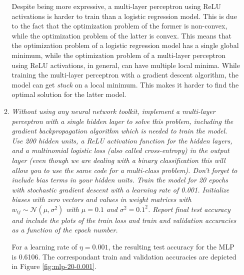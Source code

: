 \documentclass[12pt]{article}
\begin{document}
\begin{enumerate}[leftmargin=\labelsep]
\begin{enumerate}[label=\alph*)]
                    \vspace{12pt}

                    Despite being more expressive, a multi-layer perceptron using ReLU activations is harder to train than a logistic regression model. This is due to the fact that the optimization problem of the former is non-convex, while the optimization problem of the latter is convex. This means that the optimization problem of a logistic regression model has a single global minimum, while the optimization problem of a multi-layer perceptron using ReLU activations, in general, can have multiple local minima. While training the multi-layer perceptron with a gradient descent algorithm, the model can get \textit{stuck} on a local minimum. This makes it harder to find the optimal solution for the latter model.

                    \vspace{12pt}

              \item \textit{Without using any neural network toolkit, implement a multi-layer
                    perceptron with a single hidden layer to solve this problem, including the gradient
                    backpropagation algorithm which is needed to train the model. Use 200 hidden units,
                    a ReLU activation function for the hidden layers, and a multinomial logistic loss (also
                    called cross-entropy) in the output layer (even though we are dealing with a binary
                    classification this will allow you to use the same code for a multi-class problem). Don’t
                    forget to include bias terms in your hidden units. Train the model for 20 epochs with
                    stochastic gradient descent with a learning rate of 0.001. Initialize biases with zero
                    vectors and values in weight matrices with $w_{ij} \sim \mathcal{N}(\mu, \sigma^2)$ with $\mu = 0.1$ and $\sigma^2 = {0.1}^2$. Report final test accuracy and include the plots of the train loss and train and validation
                    accuracies as a function of the epoch number.
                    }

                    \vspace{12pt}

                    For a learning rate of $\eta = 0.001$, the resulting test accuracy for the MLP is 0.6106. The correspondant train and validation accuracies are depicted in Figure \ref{fig:mlp-20-0.001}.


\end{enumerate}
\end{enumerate}
\end{document}
